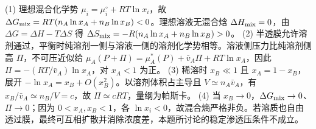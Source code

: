 (1) 理想混合化学势 \(\mu_i=\mu_i^\circ+RT\ln x_i\)，故 \(\Delta G_{\rm mix}=RT(n_A\ln x_A+n_B\ln x_B)<0\)。理想溶液无混合焓 \(\Delta H_{\rm mix}=0\)，由 \(\Delta G=\Delta H-T\Delta S\) 得 \(\Delta S_{\rm mix}=-R(n_A\ln x_A+n_B\ln x_B)>0\)。
(2) 半透膜允许溶剂通过，平衡时纯溶剂一侧与溶液一侧的溶剂化学势相等。溶液侧压力比纯溶剂侧高 \(\Pi\)，不可压近似给 \(\mu_A(P+\Pi)=\mu_A^*(P)+\bar v_A\Pi+RT\ln x_A\)，因此 \(\Pi=-(RT/\bar v_A)\ln x_A\)，对 \(x_A<1\) 为正。
(3) 稀溶时 \(x_B\ll1\) 且 \(x_A=1-x_B\)，展开 \(-\ln x_A=x_B+O(x_B^2)\)。以溶剂体积占主导且 \(V\simeq n_A\bar v_A\)，有 \(x_B/\bar v_A\simeq n_B/V=c\)，故 \(\Pi\simeq cRT\)，量纲为帕斯卡。
(4) 当 \(x_B\to0\)，\(\Delta G_{\rm mix}\to0\)、\(\Pi\to0\)；因为 \(0<x_A,x_B<1\)，各 \(\ln x_i<0\)，故混合熵严格非负。若溶质也自由透过膜，最终可互相扩散并消除浓度差，本题所讨论的稳定渗透压条件不成立。
